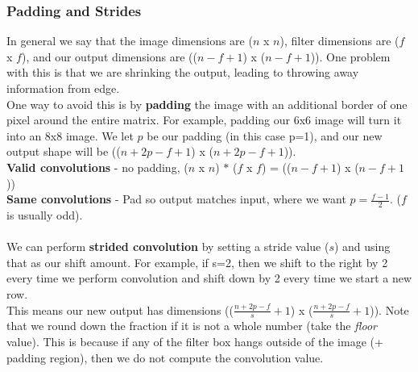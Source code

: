 \documentclass[11pt, a4paper]{article}
\begin{document}
\begin{spacing}{1.1}
	\subsubsection{Padding and Strides}
	In general we say that the image dimensions are ($n$ x $n$), filter dimensions are ($f$ x $f$), and our output dimensions are (($n-f+1$) x ($n-f+1$)). One problem with this is that we are shrinking the output, leading to throwing away information from edge. \vspace*{1mm}\\
	One way to avoid this is by \textbf{padding} the image with an additional border of one pixel around the entire matrix. For example, padding our 6x6 image will turn it into an 8x8 image. We let $p$ be our padding (in this case p=1), and our new output shape will be (($n+2p-f+1$) x ($n+2p-f+1$)). \vspace*{2mm} \\
	\textbf{Valid convolutions} - no padding, ($n$ x $n$) $*$ ($f$ x $f$) = (($n-f+1$) x ($n-f+1$)) \\
	\textbf{Same convolutions} - Pad so output matches input, where we want $p = \frac{f-1}{2}$. ($f$ is usually odd). \\~\\
	We can perform \textbf{strided convolution} by setting a stride value ($s$) and using that as our shift amount. For example, if s=2, then we shift to the right by 2 every time we perform convolution and shift down by 2 every time we start a new row. \vspace*{1mm}\\
	This means our new output has dimensions (($\frac{n+2p-f}{s}+1$) x ($\frac{n+2p-f}{s}+1$)). Note that we round down the fraction if it is not a whole number (take the \textit{floor} value). This is because if any of the filter box hangs outside of the image (+ padding region), then we do not compute the convolution value.
	

\end{spacing}
\end{document}
